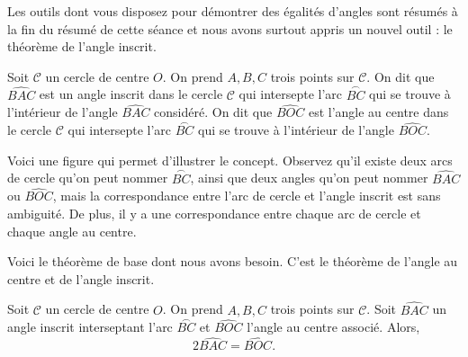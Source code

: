 Les outils dont vous disposez pour démontrer des égalités d'angles sont résumés à la fin du résumé de cette séance et nous avons surtout appris un nouvel outil : le théorème de l'angle inscrit.


\begin{dfn}
Soit $\mathcal{C}$ un cercle de centre $O$. On prend $A,B,C$ trois points sur $\mathcal{C}$. On dit que $\widehat{BAC}$ est un angle inscrit dans le cercle $\mathcal{C}$ qui intersepte l'arc $\stackrel \frown{BC}$ qui se trouve à l'intérieur de l'angle $\widehat{BAC}$ considéré. On dit que $\widehat{BOC}$ est l'angle au centre dans le cercle $\mathcal{C}$ qui intersepte l'arc $\stackrel \frown{BC}$ qui se trouve à l'intérieur de l'angle $\widehat{BOC}$.
\end{dfn}

Voici une figure qui permet d'illustrer le concept. Observez qu'il existe deux arcs de cercle qu'on peut nommer $\stackrel \frown{BC}$, ainsi que deux angles qu'on peut nommer $\widehat{BAC}$ ou $\widehat{BOC}$, mais la correspondance entre l'arc de cercle et l'angle inscrit est sans ambiguité. De plus, il y a une correspondance entre chaque arc de cercle et chaque angle au centre.
\begin{figure}[H]
\end{figure}

Voici le théorème de base dont nous avons besoin. C'est le théorème de l'angle au centre et de l'angle inscrit.

\begin{thm}
Soit $\mathcal{C}$ un cercle de centre $O$. On prend $A,B,C$ trois points sur $\mathcal{C}$. Soit $\widehat{BAC}$ un angle inscrit interseptant l'arc $\stackrel \frown{BC}$ et $\widehat{BOC}$ l'angle au centre associé. Alors,
$$
2\widehat{BAC}=\widehat{BOC}.
$$
\end{thm}


